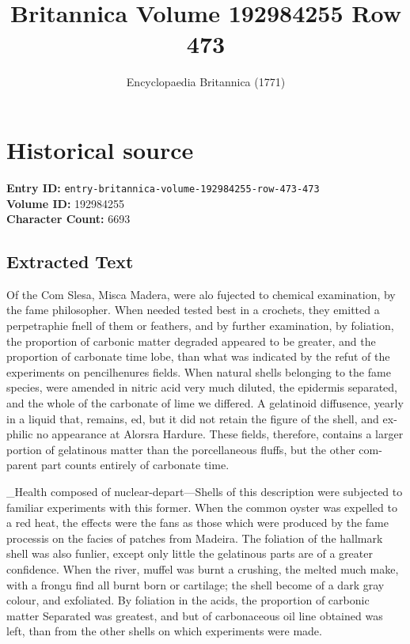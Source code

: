 \documentclass{article}
\title{Britannica Volume 192984255 Row 473}
\date{Encyclopaedia Britannica (1771)}
\begin{document}
\maketitle

\section*{Historical source}
\textbf{Entry ID:} \texttt{entry-britannica-volume-192984255-row-473-473} \\
\textbf{Volume ID:} 192984255 \\
\textbf{Character Count:} 6693

\subsection*{Extracted Text}
Of the Com Slesa, Misca Madera, were alo fujected to chemical examination, by the fame philosopher. When needed tested best in a crochets, they emitted a perpetraphie fnell of them or feathers, and by further examination, by foliation, the proportion of carbonic matter degraded appeared to be greater, and the proportion of carbonate time lobe, than what was indicated by the refut of the experiments on pencilhenures fields. When natural shells belonging to the fame species, were amended in nitric acid very much diluted, the epidermis separated, and the whole of the carbonate of lime we differed. A gelatinoid diffusence, yearly in a liquid that, remains, ed, but it did not retain the figure of the shell, and ex-philic no appearance at Alorsra Hardure. These fields, therefore, contains a larger portion of gelatinous matter than the porcellaneous fluffs, but the other com-parent part counts entirely of carbonate time.

\_Health composed of nuclear-depart—Shells of this description were subjected to familiar experiments with this former. When the common oyster was expelled to a red heat, the effects were the fans as those which were produced by the fame processis on the facies of patches from Madeira. The foliation of the hallmark shell was also funlier, except only little the gelatinous parts are of a greater confidence. When the river, muffel was burnt a crushing, the melted much make, with a frongu find all burnt born or cartilage; the shell become of a dark gray colour, and exfoliated. By foliation in the acids, the proportion of carbonic matter Separated was greatest, and but of carbonaceous oil line obtained was left, than from the other shells on which experiments were made.
\end{document}
